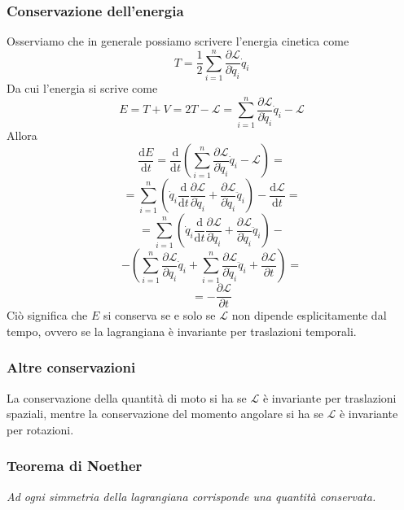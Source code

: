 \documentclass[a4paper,11pt]{article}
\begin{document}
\subsubsection{Conservazione dell'energia}

\noindent Osserviamo che in generale possiamo scrivere l'energia cinetica come
$$T=\frac{1}{2}\sum_{i=1}^{n}\frac{\partial\mathcal{L}}{\partial\dot{q}_i}\dot{q}_i$$
Da cui l'energia si scrive come
$$E=T+V=2T-\mathcal{L}=\sum_{i=1}^{n}\frac{\partial\mathcal{L}}{\partial\dot{q}_i}\dot{q}_i-\mathcal{L}$$
Allora
$$\frac{\mathrm{d}E}{\mathrm{d}t}=\frac{\mathrm{d}}{\mathrm{d}t}\left(\sum_{i=1}^{n}\frac{\partial\mathcal{L}}{\partial\dot{q}_i}\dot{q}_i-\mathcal{L}\right)=$$
$$=\sum_{i=1}^{n}\left(\dot{q}_i\frac{\mathrm{d}}{\mathrm{d}t}\frac{\partial\mathcal{L}}{\partial\dot{q}_i}+\frac{\partial\mathcal{L}}{\partial\dot{q}_i}\ddot{q}_i\right)-\frac{\mathrm{d}\mathcal{L}}{\mathrm{d}t}= $$
$$=\sum_{i=1}^{n}\left(\dot{q}_i\frac{\mathrm{d}}{\mathrm{d}t}\frac{\partial\mathcal{L}}{\partial\dot{q}_i}+\frac{\partial\mathcal{L}}{\partial\dot{q}_i}\ddot{q}_i\right)-$$
$$-\left(\sum_{i=1}^{n}\frac{\partial\mathcal{L}}{\partial q_i}\dot{q}_i+\sum_{i=1}^{n}\frac{\partial\mathcal{L}}{\partial \dot{q}_i}\ddot{q}_i+\frac{\partial\mathcal{L}}{\partial t}\right)=$$$$=-\frac{\partial\mathcal{L}}{\partial t}$$
Ciò significa che $E$ si conserva se e solo se $\mathcal{L}$ non dipende esplicitamente dal tempo, ovvero se la lagrangiana è invariante per traslazioni temporali.
\subsubsection{Altre conservazioni}

\noindent La conservazione della quantità di moto si ha se $\mathcal{L}$ è invariante per traslazioni spaziali, mentre la conservazione del momento angolare si ha se $\mathcal{L}$ è invariante per rotazioni.

\subsubsection{Teorema di Noether} \textit{Ad ogni simmetria della lagrangiana corrisponde una quantità conservata.}
\end{document}
